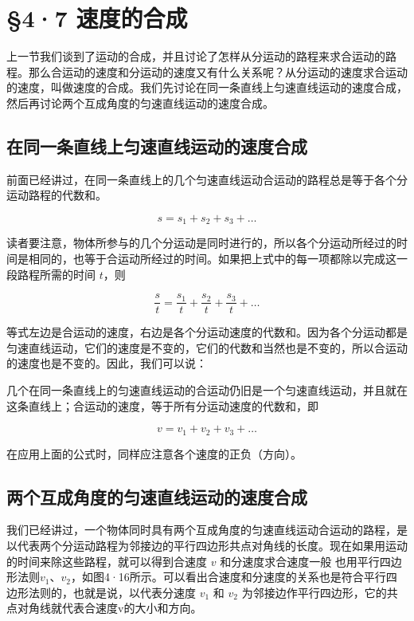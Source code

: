 \section{§4·7 速度的合成}\label{ux901fux5ea6ux7684ux5408ux6210}

上一节我们谈到了运动的合成，并且讨论了怎样从分运动的路程来求合运动的路程。那么合运动的速度和分运动的速度又有什么关系呢？从分运动的速度求合运动的速度，叫做速度的合成。我们先讨论在同一条直线上匀速直线运动的速度合成，然后再讨论两个互成角度的匀速直线运动的速度合成。

\subsection{在同一条直线上匀速直线运动的速度合成}\label{ux5728ux540cux4e00ux6761ux76f4ux7ebfux4e0aux5300ux901fux76f4ux7ebfux8fd0ux52a8ux7684ux901fux5ea6ux5408ux6210}

前面已经讲过，在同一条直线上的几个匀速直线运动合运动的路程总是等于各个分运动路程的代数和。

\[
s = s _ {1} + s _ {2} + s _ {3} + \dots
\]

读者要注意，物体所参与的几个分运动是同时进行的，所以各个分运动所经过的时间是相同的，也等于合运动所经过的时间。如果把上式中的每一项都除以完成这一段路程所需的时间
\(t\)，则

\[
\frac {s}{t} = \frac {s _ {1}}{t} + \frac {s _ {2}}{t} + \frac {s _ {3}}{t} + \dots
\]

等式左边是合运动的速度，右边是各个分运动速度的代数和。因为各个分运动都是匀速直线运动，它们的速度是不变的，它们的代数和当然也是不变的，所以合运动的速度也是不变的。因此，我们可以说：

几个在同一条直线上的匀速直线运动的合运动仍旧是一个匀速直线运动，并且就在这条直线上；合运动的速度，等于所有分运动速度的代数和，即

\[
v = v _ {1} + v _ {2} + v _ {3} + \dots
\]

在应用上面的公式时，同样应注意各个速度的正负（方向）。

\subsection{两个互成角度的匀速直线运动的速度合成}\label{ux4e24ux4e2aux4e92ux6210ux89d2ux5ea6ux7684ux5300ux901fux76f4ux7ebfux8fd0ux52a8ux7684ux901fux5ea6ux5408ux6210}

我们已经讲过，一个物体同时具有两个互成角度的匀速直线运动合运动的路程，是以代表两个分运动路程为邻接边的平行四边形共点对角线的长度。现在如果用运动的时间来除这些路程，就可以得到合速度
\(v\) 和分速度求合速度一般
也用平行四边形法则\(v_{1}\)、\(v_{2}\)，如图4·16所示。可以看出合速度和分速度的关系也是符合平行四边形法则的，也就是说，以代表分速度
\(v_{1}\) 和 \(v_{2}\)
为邻接边作平行四边形，它的共点对角线就代表合速度v的大小和方向。

